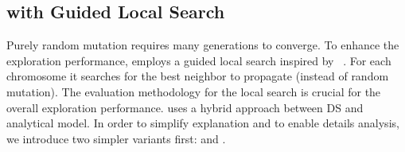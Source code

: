 \subsection{\ga with Guided Local Search}
\label{sec:GALS}

Purely random mutation requires many generations to converge. To enhance the exploration performance, \ga employs a guided local search inspired by ~\cite{wen2011heuristic}. For each chromosome it searches for the best neighbor to propagate (instead of random mutation). The evaluation methodology for the local search is crucial for the overall exploration performance. \ga uses a hybrid approach between DS and analytical model. In order to simplify explanation and to enable details analysis, we introduce two simpler variants first: \gads and \gaana.








